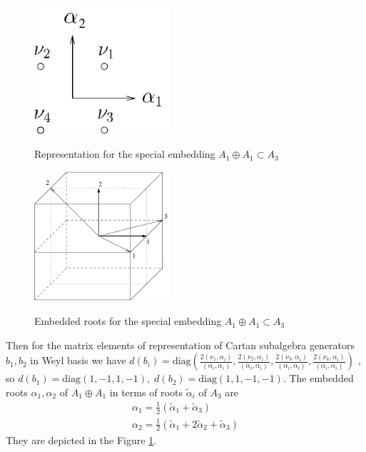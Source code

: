 \documentclass[a4paper,12pt]{article}
\theoremstyle{definition} \newtheorem{Def}{Definition}
\begin{document}
\begin{figure}[h!tb]
  \begin{multicols}{2}
    \hfill
    \includegraphics[width=50mm]{A_1+A_1_to_A3.pdf}
    \hfill
    \caption{Representation for the special embedding  $A_1\oplus A_1\subset A_3$}
    \label{fig:A_1+A_1_to_A3}
    \hfill
    \includegraphics[width=50mm]{A1+A1-A3.pdf}
    \hfill
    \caption{Embedded roots for the special embedding  $A_1\oplus A_1\subset A_3$}
    \label{fig:A1+A1-A3}
  \end{multicols}
\end{figure}

Then for the matrix elements of representation of Cartan subalgebra generators $b_1,b_2$ in Weyl basis we have $d(b_i)=\mathrm{diag}\left(\frac{2(\nu_1,\alpha_i)}{(\alpha_i,\alpha_i)},\frac{2(\nu_2,\alpha_i)}{(\alpha_i,\alpha_i)},\frac{2(\nu_3,\alpha_i)}{(\alpha_i,\alpha_i)},\frac{2(\nu_4,\alpha_i)}{(\alpha_i,\alpha_i)}\right)$ \cite{vasilevich1986method}, so $d(b_1)=\mathrm{diag}(1,-1,1,-1),\; d(b_2)=\mathrm{diag}(1,1,-1,-1)$.  The embedded roots $\alpha_1,\alpha_2$ of $A_1\oplus A_1$ in terms of roots $\tilde{\alpha}_i$ of $A_3$ are
\begin{equation}
  \label{eq:37}
  \begin{array}{l}
     \alpha_1=\frac{1}{2}(\tilde{\alpha}_1+\tilde{\alpha}_3)\\
     \alpha_2=\frac{1}{2}(\tilde{\alpha}_1+2\tilde{\alpha}_2+\tilde{\alpha}_3)
  \end{array}
\end{equation}
They are depicted in the Figure \ref{fig:A1+A1-A3}.
\end{document}
